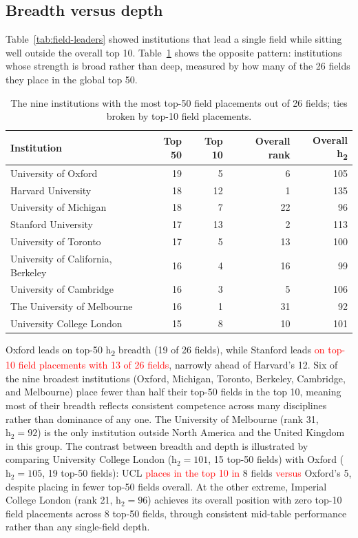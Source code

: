 \subsection{Breadth versus depth}
\label{subsec:breadth}
Table~\ref{tab:field-leaders} showed institutions that lead a single field while sitting well outside the overall top 10. Table~\ref{tab:breadth} shows the opposite pattern: institutions whose strength is broad rather than deep, measured by how many of the 26 fields they place in the global top 50.

\begin{table}[h]
	\centering
	\caption{The nine institutions with the most top-50 field placements out of 26 fields; ties broken by top-10 field placements.}
	\label{tab:breadth}
	\begin{tabular}{@{}lrrrr@{}}
	\toprule
	Institution & Top 50 & Top 10 & Overall rank & Overall h\textsubscript{2} \\
	\midrule
	University of Oxford & 19 & 5 & 6 & 105 \\
	Harvard University & 18 & 12 & 1 & 135 \\
	University of Michigan & 18 & 7 & 22 & 96 \\
	Stanford University & 17 & 13 & 2 & 113 \\
	University of Toronto & 17 & 5 & 13 & 100 \\
	University of California, Berkeley & 16 & 4 & 16 & 99 \\
	University of Cambridge & 16 & 3 & 5 & 106 \\
	The University of Melbourne & 16 & 1 & 31 & 92 \\
	University College London & 15 & 8 & 10 & 101 \\
	\bottomrule
	\end{tabular}
\end{table}

Oxford leads on top-50 h\textsubscript{2} breadth (19 of 26 fields), while Stanford leads \textcolor{red}{on top-10 field placements with 13 of 26 fields}, narrowly ahead of Harvard's 12. Six of the nine broadest institutions (Oxford, Michigan, Toronto, Berkeley, Cambridge, and Melbourne) place fewer than half their top-50 fields in the top 10, meaning most of their breadth reflects consistent competence across many disciplines rather than dominance of any one. The University of Melbourne (rank 31, $\mathrm{h}_2=92$) is the only institution outside North America and the United Kingdom in this group. The contrast between breadth and depth is illustrated by comparing University College London ($\mathrm{h}_2=101$, 15 top-50 fields) with Oxford ($\mathrm{h}_2=105$, 19 top-50 fields): UCL \textcolor{red}{places in the top 10 in} 8 fields \textcolor{red}{versus} Oxford's 5, despite placing in fewer top-50 fields overall. At the other extreme, Imperial College London (rank 21, $\mathrm{h}_2=96$) achieves its overall position with zero top-10 field placements across 8 top-50 fields, through consistent mid-table performance rather than any single-field depth.

